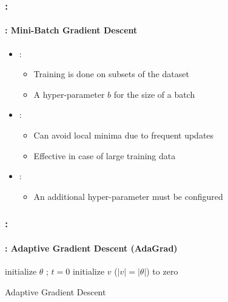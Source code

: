 \documentclass[xcolor=table]{beamer}
\begin{document}
\begin{frame}
	\frametitle{\insertshortsubtitle: \insertsection}
	\framesubtitle{\insertsubsection: Mini-Batch Gradient Descent}
	
	\begin{itemize}
		\item {}:
		\begin{itemize}
			\item Training is done on subsets of the dataset
			\item A hyper-parameter $b$ for the size of a batch
		\end{itemize}
		\item {}:
		\begin{itemize}
			\item Can avoid local minima due to frequent updates
			\item Effective in case of large training data
		\end{itemize}
		\item {}:
		\begin{itemize}
			\item An additional hyper-parameter must be configured
		\end{itemize}
	\end{itemize}

\end{frame}


\begin{frame}
	\frametitle{\insertshortsubtitle: \insertsection}
	\framesubtitle{\insertsubsection: Adaptive Gradient Descent (AdaGrad)}
	
	\begin{algorithm}[H]
		\KwResult{$ \theta $}
		initialize $ \theta $ ; $ t = 0 $\;
		initialize $v$ ($|v| = |\theta|$) to zero\;
		\caption{Adaptive Gradient Descent \cite{2011-duchi-al}}
	\end{algorithm}

\end{frame}
\end{document}
